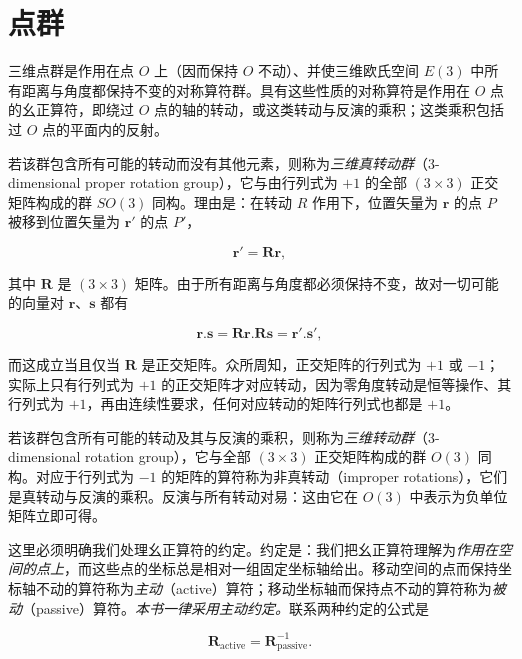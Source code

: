\section{点群}

三维点群是作用在点 $O$ 上（因而保持 $O$ 不动）、并使三维欧氏空间 $E(3)$ 中所有距离与角度都保持不变的对称算符群。具有这些性质的对称算符是作用在 $O$ 点的幺正算符，即绕过 $O$ 点的轴的转动，或这类转动与反演的乘积；这类乘积包括过 $O$ 点的平面内的反射。

若该群包含所有可能的转动而没有其他元素，则称为\textit{三维真转动群}（3-dimensional proper rotation group），它与由行列式为 $+1$ 的全部 $(3 \times 3)$ 正交矩阵构成的群 $SO(3)$ 同构。理由是：在转动 $R$ 作用下，位置矢量为 $\mathbf{r}$ 的点 $P$ 被移到位置矢量为 $\mathbf{r}'$ 的点 $P'$，

\begin{equation*}
\mathbf{r}' = \mathbf{R}\mathbf{r},
\tag{1.4.1}
\end{equation*}

其中 $\mathbf{R}$ 是 $(3 \times 3)$ 矩阵。由于所有距离与角度都必须保持不变，故对一切可能的向量对 $\mathbf{r}$、$\mathbf{s}$ 都有

\begin{equation*}
\mathbf{r}.\mathbf{s} = \mathbf{Rr}.\mathbf{Rs} = \mathbf{r}'.\mathbf{s}',
\tag{1.4.2}
\end{equation*}

而这成立当且仅当 $\mathbf{R}$ 是正交矩阵。众所周知，正交矩阵的行列式为 $+1$ 或 $-1$；实际上只有行列式为 $+1$ 的正交矩阵才对应转动，因为零角度转动是恒等操作、其行列式为 $+1$，再由连续性要求，任何对应转动的矩阵行列式也都是 $+1$。

若该群包含所有可能的转动及其与反演的乘积，则称为\textit{三维转动群}（3-dimensional rotation group），它与全部 $(3 \times 3)$ 正交矩阵构成的群 $O(3)$ 同构。对应于行列式为 $-1$ 的矩阵的算符称为非真转动（improper rotations），它们是真转动与反演的乘积。反演与所有转动对易：这由它在 $O(3)$ 中表示为负单位矩阵立即可得。

这里必须明确我们处理幺正算符的约定。约定是：我们把幺正算符理解为\textit{作用在空间的点上}，而这些点的坐标总是相对一组固定坐标轴给出。移动空间的点而保持坐标轴不动的算符称为\textit{主动}（active）算符；移动坐标轴而保持点不动的算符称为\textit{被动}（passive）算符。\textit{本书一律采用主动约定。}联系两种约定的公式是

\begin{equation*}
\mathbf{R}_{\mathrm{active}} = \mathbf{R}_{\mathrm{passive}}^{-1}.
\tag{1.4.3}
\end{equation*}


